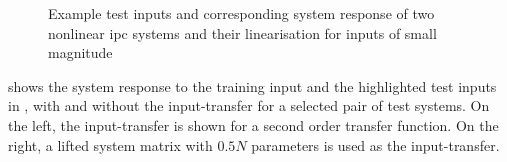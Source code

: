 \begin{figure}
    \caption[IPC -- Test Data (Low Amplitude)]{Example test inputs and corresponding system response of two nonlinear \acrshort{ipc} systems and their linearisation for inputs of small magnitude}
    \label{fig:sim2_test_inputs_outputs}
\end{figure}


 shows the system response to the training input and the highlighted test inputs in ,  with and without the input-transfer for a selected pair of test systems. On the left, the input-transfer is shown for a second order transfer function. On the right, a lifted system matrix with $0.5N$ parameters is used as the input-transfer.


